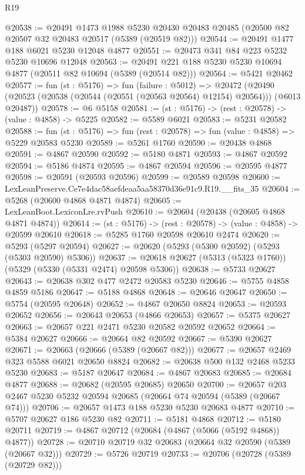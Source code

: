 \begin{lexlean}{R19}
\begin{coremodule}
@20538 := @20491
    @1473
    @1988
    @5230
    @20430
    @20483
    @20485
    (@20500 @82 @20507 @32 @20483 @20517 (@5389 (@20519 @82)))
@20544 := @20491 @1477 @188 @6021 @5230 @12048 @4877
@20551 := @20473 @341 @84 @223 @5232 @5230 @10696 @12048
@20563 := @20491 @221 @188 @5230 @5230 @10694 @4877 (@20511 @82 @10694 (@5389 (@20514 @82)))
@20564 := @5421 @20462
@20577 := fun (st : @5176) =>
  fun (failure : @5012) =>
  @20472 (@20490 (@20523 (@20538 (@20544 (@20551 (@20563 @20564) @12154) @20564))) (@6013 @20487))
@20578 := @6 @5158
@20581 := (st : @5176) -> (rest : @20578) -> (value : @4858) -> @5225
@20582 := @5589 @6021
@20583 := @5231 @20582
@20588 := fun (st : @5176) => fun (rest : @20578) => fun (value : @4858) => @5229 @20583 @5230
@20589 := @5261 @1760
@20590 := @20438 @4868
@20591 := @4867 @20590
@20592 := @5180 @4871
@20593 := @4867 @20592
@20594 := @5186 @4874
@20595 := @4867 @20594
@20596 := @20595 @4877
@20598 := @20591 (@20593 @20596)
@20599 := @20589 @20598
@20600 := LexLeanPreserve.Ce7e4dac58aefdeaa5aa58370d36e91c9.R19.__fits_35
@20604 := @5268 (@20600 @4868 @4871 @4874)
@20605 := LexLeanBoot.LexiconLre.rvPush
@20610 := @20604 (@20438 (@20605 @4868 @4871 @4874))
@20614 := (st : @5176) -> (rest : @20578) -> (value : @4858) -> @20599 @20610
@20618 := @5285 @1760 @20598 @20610 @2474
@20620 := @5293 (@5297 @20594)
@20627 := @20620 (@5293 (@5300 @20592) (@5293 (@5303 @20590) @5306))
@20637 := @20618 @20627 (@5313 (@5323 @1760)) (@5329 (@5330 (@5331 @2474) @20598 @5306))
@20638 := @5733 @20627
@20643 := @20638 @302 @477 @2472 @20583 @5230
@20646 := @5755 @4858 @4859 @5186
@20647 := @5188 @4868
@20648 := @20646 @20647
@20650 := @5754 (@20595 @20648)
@20652 := @4867 @20650 @8824
@20653 := @20593 @20652
@20656 := @20643 @20653 (@4866 @20653)
@20657 := @5375 @20627
@20663 := @20657 @221 @2471 @5230 @20582 @20592 @20652
@20664 := @5384 @20627
@20666 := @20664 @82 @20592
@20667 := @5390 @20627
@20671 := @20663 (@20666 (@5389 (@20667 @82)))
@20677 := @20657 @2469 @323 @5588 @6021 @20650 @8824
@20682 := @20638 @500 @132 @2468 @5233 @5230
@20683 := @5187 @20647
@20684 := @4867 @20683
@20685 := @20684 @4877
@20688 := @20682 (@20595 @20685) @20650
@20700 := @20657 @203 @2467 @5230 @5232 @20594 @20685 (@20664 @74 @20594 (@5389 (@20667 @74)))
@20706 := @20657 @1473 @188 @5230 @5230 @20683 @4877
@20710 := @5707 @20627 @186 @5230 @82
@20711 := @5181 @4868
@20712 := @5180 @20711
@20719 := @4867 @20712 (@20684 (@4867 (@5066 (@5192 @4868)) @4877))
@20728 := @20710 @20719 @32 @20683 (@20664 @32 @20590 (@5389 (@20667 @32)))
@20729 := @5726 @20719
@20733 := @20706 (@20728 (@5389 (@20729 @82)))

\end{coremodule}
\end{lexlean}
